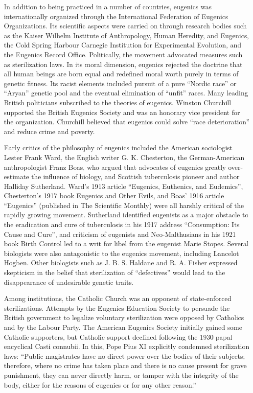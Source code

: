 In addition to being practiced in a number of countries, eugenics was internationally organized through the International Federation of Eugenics Organizations. Its scientific aspects were carried on through research bodies such as the Kaiser Wilhelm Institute of Anthropology, Human Heredity, and Eugenics, the Cold Spring Harbour Carnegie Institution for Experimental Evolution, and the Eugenics Record Office. Politically, the movement advocated measures such as sterilization laws. In its moral dimension, eugenics rejected the doctrine that all human beings are born equal and redefined moral worth purely in terms of genetic fitness. Its racist elements included pursuit of a pure ``Nordic race'' or ``Aryan'' genetic pool and the eventual elimination of ``unfit'' races. Many leading British politicians subscribed to the theories of eugenics. Winston Churchill supported the British Eugenics Society and was an honorary vice president for the organization. Churchill believed that eugenics could solve ``race deterioration'' and reduce crime and poverty.

Early critics of the philosophy of eugenics included the American sociologist Lester Frank Ward, the English writer G. K. Chesterton, the German-American anthropologist Franz Boas, who argued that advocates of eugenics greatly over-estimate the influence of biology, and Scottish tuberculosis pioneer and author Halliday Sutherland. Ward's 1913 article ``Eugenics, Euthenics, and Eudemics'', Chesterton's 1917 book Eugenics and Other Evils, and Boas' 1916 article ``Eugenics'' (published in The Scientific Monthly) were all harshly critical of the rapidly growing movement. Sutherland identified eugenists as a major obstacle to the eradication and cure of tuberculosis in his 1917 address ``Consumption: Its Cause and Cure'', and criticism of eugenists and Neo-Malthusians in his 1921 book Birth Control led to a writ for libel from the eugenist Marie Stopes. Several biologists were also antagonistic to the eugenics movement, including Lancelot Hogben. Other biologists such as J. B. S. Haldane and R. A. Fisher expressed skepticism in the belief that sterilization of ``defectives'' would lead to the disappearance of undesirable genetic traits.

Among institutions, the Catholic Church was an opponent of state-enforced sterilizations. Attempts by the Eugenics Education Society to persuade the British government to legalize voluntary sterilization were opposed by Catholics and by the Labour Party. The American Eugenics Society initially gained some Catholic supporters, but Catholic support declined following the 1930 papal encyclical Casti connubii. In this, Pope Pius XI explicitly condemned sterilization laws: ``Public magistrates have no direct power over the bodies of their subjects; therefore, where no crime has taken place and there is no cause present for grave punishment, they can never directly harm, or tamper with the integrity of the body, either for the reasons of eugenics or for any other reason.''

